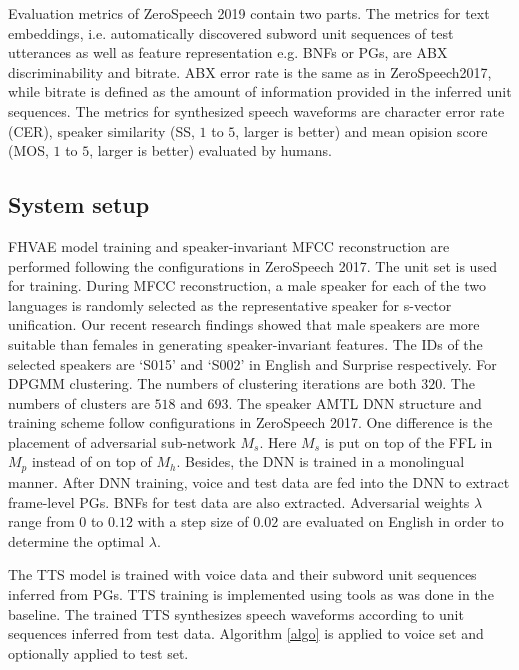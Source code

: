 \documentclass[a4paper]{article}
\begin{document}
Evaluation metrics of ZeroSpeech 2019 contain two parts. The metrics for text embeddings, i.e. automatically discovered subword unit sequences of test utterances as well as feature representation e.g. BNFs or PGs, are ABX discriminability and bitrate.  ABX error rate is the same as in ZeroSpeech2017, while bitrate is defined as the amount of information provided in the inferred unit sequences.
The metrics for synthesized speech waveforms are character error rate (CER), speaker similarity (SS, $1$ to $5$, larger is better) and mean opision score (MOS, $1$ to $5$, larger is better) evaluated by humans.

\subsection{System setup}
FHVAE model training and speaker-invariant MFCC reconstruction are performed following the configurations in ZeroSpeech 2017. The unit set is used for training. During MFCC reconstruction, a male speaker for each of the two languages is randomly selected as the representative speaker for s-vector unification. Our recent research findings \cite{Feng2019improving} showed that male speakers are more suitable than females in generating speaker-invariant features. The IDs of the selected speakers are  `S015' and `S002' in English and Surprise respectively.
For DPGMM clustering. The numbers of clustering iterations are both $320$. The numbers of clusters are $518$ and $693$. 
The speaker AMTL DNN structure and training scheme follow configurations in ZeroSpeech 2017. One difference is the placement of  adversarial sub-network $M_s$. Here $M_s$ is put on top of the FFL in $M_p$ instead of on top of $M_h$.
Besides, the DNN is trained in a monolingual manner. After DNN training,  voice and test data are fed into the DNN to extract frame-level PGs. BNFs for test data are also extracted. Adversarial weights $\lambda$ range from $0$ to $0.12$ with a step size of $0.02$ are evaluated on English in order to determine the optimal $\lambda$.

The TTS model is trained with voice data and their subword unit sequences inferred from PGs. TTS training is implemented using tools \cite{wu2016merlin} as was done in the baseline. The trained TTS synthesizes speech waveforms according to unit sequences inferred from test data. Algorithm \ref{algo} is applied to voice set and optionally applied to test set.
\end{document}
